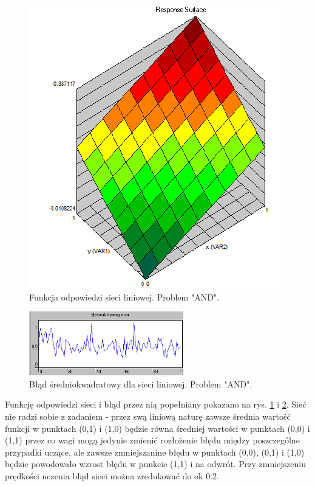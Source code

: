 \begin{enumerate}
\begin{figure}[h]
\centering
\includegraphics[scale=0.75]{dane/part1/zad2/response}
\caption{Funkcja odpowiedzi sieci liniowej. Problem "AND".\label{fig:response_linear}}
\end{figure}

\begin{figure}[h]
\centering
\includegraphics[width=0.6\textwidth]{dane/part1/zad2/error}
\caption{Błąd średniokwadratowy dla sieci liniowej. Problem "AND".\label{fig:error_linear}}
\end{figure}
%

Funkcję odpowiedzi sieci i błąd przez nią popełniany pokazano na rys. \ref{fig:response_linear} i \ref{fig:error_linear}. Sieć nie radzi sobie z zadaniem - przez swą liniową naturę zawsze średnia wartość funkcji w punktach (0,1) i (1,0)  będzie równa średniej wartości w punktach (0,0) i (1,1) przez co wagi mogą jedynie zmienić rozłożenie błędu między poszczególne przypadki uczące, ale zawsze zmniejszanine błędu w punktach (0,0), (0,1) i (1,0) będzie powodowało wzrost błędu w punkcie (1,1) i na odwrót. Przy zmniejszeniu prędkości uczenia błąd sieci można zredukować do ok 0.2.


\end{enumerate}
